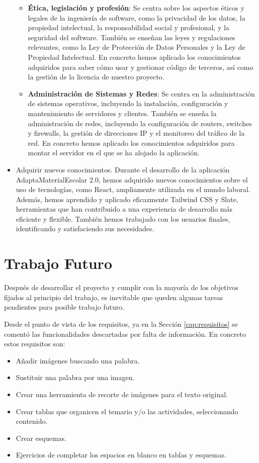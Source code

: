 \begin{itemize}
\begin{itemize}
        \item \textbf{Ética, legislación y profesión}: Se centra sobre los aspectos éticos y legales de la ingeniería de software, como la privacidad de los datos, la propiedad intelectual, la responsabilidad social y profesional, y la seguridad del software. También se enseñan las leyes y regulaciones relevantes, como la Ley de Protección de Datos Personales y la Ley de Propiedad Intelectual. En concreto hemos aplicado los conocimientos adquiridos para saber cómo usar y gestionar código de terceros, así como la gestión de la licencia de nuestro proyecto.
        \item \textbf{Administración de Sistemas y Redes}: Se centra en la administración de sistemas operativos, incluyendo la instalación, configuración y mantenimiento de servidores y clientes. También se enseña la administración de redes, incluyendo la configuración de routers, switches y firewalls, la gestión de direcciones IP y el monitoreo del tráfico de la red. En concreto hemos aplicado los conocimientos adquiridos para montar el servidor en el que se ha alojado la aplicación.
    \end{itemize}
    \item Adquirir nuevos conocimientos.
    Durante el desarrollo de la aplicación AdaptaMaterialEscolar 2.0, hemos adquirido nuevos conocimientos sobre el uso de tecnologías, como React, ampliamente utilizada en el mundo laboral. Además, hemos aprendido y aplicado eficazmente Tailwind CSS y Slate, herramientas que han contribuido a una experiencia de desarrollo más eficiente y flexible. También hemos trabajado con los usuarios finales, identificando y satisfaciendo sus necesidades.
 \end{itemize}




\section{Trabajo Futuro}
\label{sec:TrabajoFuturo}
Después de desarrollar el proyecto y cumplir con la mayoría de los objetivos fijados al principio del trabajo, es inevitable que queden algunas tareas pendientes para posible trabajo futuro.

Desde el punto de vista de los requisitos, ya en la Sección \ref{cap:requisitos} se comentó las funcionalidades descartadas por falta de información. En concreto estos requisitos son:
\begin{itemize}
    \item Añadir imágenes buscando una palabra.
    \item Sustituir una palabra por una imagen.
    \item Crear una herramienta de recorte de imágenes para el texto original.
    \item Crear tablas que organicen el temario y/o las actividades, seleccionando contenido.
    \item Crear esquemas.
    \item Ejercicios de completar los espacios en blanco en tablas y esquemas.
\end{itemize}

